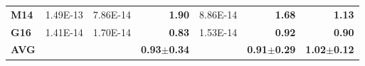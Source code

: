 \documentclass[encoding=utf8,british]{tumphthesis}
\begin{document}
\begin{table}[H]
\begin{subtable}{1.0\textwidth}
{\begin{tabular}{|l|llr|lr|r|}
\rowcolor[HTML]{CFE2F3} 
\textbf{M14}                              & 1.49E-13                                             & 7.86E-14                                              & \textbf{1.90}                                    & 8.86E-14                                                       & \textbf{1.68}                                    & \textbf{1.13}                                            \\
\textbf{G16}                              & 1.41E-14                                             & 1.70E-14                                              & \textbf{0.83}                                    & 1.53E-14                                                       & \textbf{0.92}                                    & \textbf{0.90}                                            \\ \hline
\rowcolor[HTML]{CFE2F3} 
\textbf{AVG}                             &                                                      &                                                       & \textbf{0.93$\pm$0.34}                           &                                                                & \textbf{0.91$\pm$0.29}                           & \textbf{1.02$\pm$0.12}                                   \\ \hline
\end{tabular}}
    \end{subtable}

    \bigskip

    \hfill


\end{table}
\end{document}
